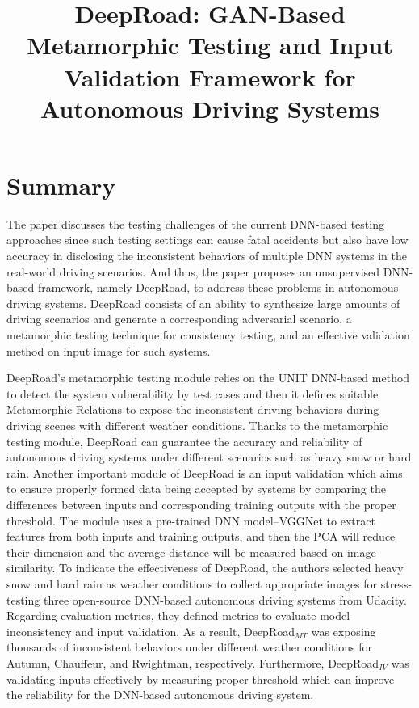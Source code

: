 \documentclass[10pt,a4paper]{report}
\title{DeepRoad: GAN-Based Metamorphic Testing and Input Validation Framework for Autonomous Driving Systems}
\begin{document}
\begin{center}
\textbf{\thetitle}
\end{center}


\section{Summary}
The paper discusses the testing challenges of the current DNN-based testing approaches since such testing settings can cause fatal accidents but also have low accuracy in disclosing the inconsistent behaviors of multiple DNN systems in the real-world driving scenarios.
%
And thus, the paper proposes an unsupervised DNN-based framework, namely DeepRoad, to address these problems in autonomous driving systems.
%
DeepRoad consists of an ability to synthesize large amounts of driving scenarios and generate a corresponding adversarial scenario, a metamorphic testing technique for consistency testing, and an effective validation method on input image for such systems.
%

DeepRoad's metamorphic testing module relies on the UNIT DNN-based method to detect the system vulnerability by test cases and then it defines suitable Metamorphic Relations to expose the inconsistent driving behaviors during driving scenes with different weather conditions.
%
Thanks to the metamorphic testing module, DeepRoad can guarantee the accuracy and reliability of autonomous driving systems under different scenarios such as heavy snow or hard rain.
%
Another important module of DeepRoad is an input validation which aims to ensure properly formed data being accepted by systems by comparing the differences between inputs and corresponding training outputs with the proper threshold.
%
The module uses a pre-trained DNN model–VGGNet to extract features from both inputs and training outputs, and then the PCA will reduce their dimension and the average distance will be measured based on image similarity.
%
To indicate the effectiveness of DeepRoad, the authors selected heavy snow and hard rain as weather conditions to collect appropriate images for stress-testing three open-source DNN-based autonomous driving systems from Udacity.
%
Regarding evaluation metrics, they defined metrics to evaluate model inconsistency and input validation.
%
As a result, DeepRoad$_{MT}$ was exposing thousands of inconsistent behaviors under different weather conditions for Autumn, Chauffeur, and Rwightman, respectively.
%
Furthermore, DeepRoad$_{IV}$ was validating inputs effectively by measuring proper threshold which can improve the reliability for the DNN-based autonomous driving system.
\end{document}
